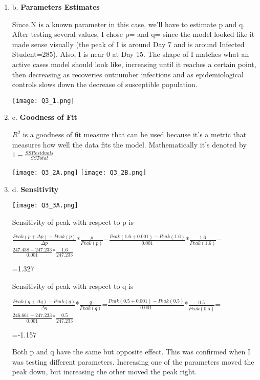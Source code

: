 \documentclass[12pt]{amsart}
\newcounter{probnum}
\newenvironment{prob}{\begin{enumerate}\setcounter{enumi}{\value{probnum}}}%
 {\setcounter{probnum}{\value{enumi}}\end{enumerate}}
\begin{document}
\begin{prob}
 \item[b.] {\bf Parameters Estimates}
  \bigskip 
  
  \noindent Since N is a known parameter in this case, we'll have to estimate p and q. After testing several values, I chose p= and q= since the model looked like it made sense visually (the peak of I is around Day 7 and is around Infected Student=285). Also, I is near 0 at Day 15. The shape of I matches what an active cases model should look like, increasing until it reaches a certain point, then decreasing as recoveries outnumber infections and as epidemiological controls slows down the decrease of susceptible population.

\begin{center} 
    \texttt{[image: Q3\_1.png]}
\end{center}
    
     \item[c.] {\bf Goodness of Fit}
  
  \noindent $R^2$ is a goodness of fit measure that can be used because it's a metric that measures how well the data fits the model. Mathematically it's denoted by $1-\frac{SS Residuals}{SS Total}$.
  
\begin{center} 
    \texttt{[image: Q3\_2A.png]}
    \vspace{0.5em} 
    \texttt{[image: Q3\_2B.png]}
    \end{center}
    
\item[d.] {\bf Sensitivity}

\begin{center} 
    \texttt{[image: Q3\_3A.png]}
\end{center}
    
    \noindent Sensitivity of peak with respect to p is 
    
    $\frac{Peak(p+\Delta p)-Peak(p)}{\Delta p}$*$\frac{p}{Peak(p)}$=$\frac{Peak(1.6+0.001)-Peak(1.6)}{0.001}$*$\frac{1.6}{Peak(1.6)}$=$\frac{247.438-247.233}{0.001}$*$\frac{1.6}{247.233}$
    
    =1.327
    
    \bigskip
    
    \noindent Sensitivity of peak with respect to q is 
    
    $\frac{Peak(q+\Delta q)-Peak(q)}{\Delta q}$*$\frac{q}{Peak(q)}$=$\frac{Peak(0.5+0.001)-Peak(0.5)}{0.001}$*$\frac{0.5}{Peak(0.5)}$=$\frac{246.661-247.233}{0.001}$*$\frac{0.5}{247.233}$
    
    =-1.157
    
    \bigskip
    
    \noindent Both p and q have the same but opposite effect. This was confirmed when I was testing different parameters. Increasing one of the parameters moved the peak down, but increasing the other moved the peak right.


 \end{prob}
 
 
\end{document}
